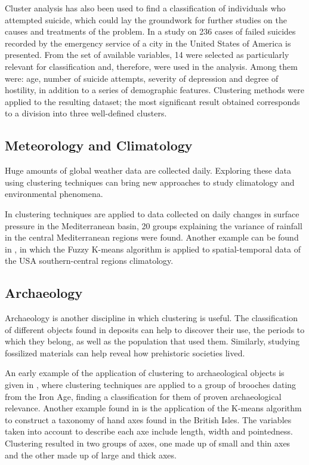 Cluster analysis has also been used to find a classification of individuals who attempted suicide, which could lay the groundwork for further studies on the causes and treatments of the problem. In \cite{paykel1978classification} a study on 236 cases of failed suicides recorded by the emergency service of a city in the United States of America is presented. From the set of available variables, 14 were selected as particularly relevant for classification and, therefore, were used in the analysis. Among them were: age, number of suicide attempts, severity of depression and degree of hostility, in addition to a series of demographic features. Clustering methods were applied to the resulting dataset; the most significant result obtained corresponds to a division into three well-defined clusters.

\subsection{Meteorology and Climatology}

Huge amounts of global weather data are collected daily. Exploring these data using clustering techniques can bring new approaches to study climatology and environmental phenomena.

In \cite{littmann2000empirical} clustering techniques are applied to data collected on daily changes in surface pressure in the Mediterranean basin, 20 groups explaining the variance of rainfall in the central Mediterranean regions were found. Another example can be found in \cite{liu2005mining}, in which the Fuzzy K-means algorithm is applied to spatial-temporal data of the USA southern-central regions climatology. 

\subsection{Archaeology}

Archaeology is another discipline in which clustering is useful. The classification of different objects found in deposits can help to discover their use, the periods to which they belong, as well as the population that used them. Similarly, studying fossilized materials can help reveal how prehistoric societies lived. 

An early example of the application of clustering to archaeological objects is given in \cite{hodson1966some}, where clustering techniques are applied to a group of brooches dating from the Iron Age, finding a classification for them of proven archaeological relevance. Another example found in \cite{hodson1971numerical} is the application of the K-means algorithm to construct a taxonomy of hand axes found in the British Isles. The variables taken into account to describe each axe include length, width and pointedness. Clustering resulted in two groups of axes, one made up of small and thin axes and the other made up of large and thick axes.

